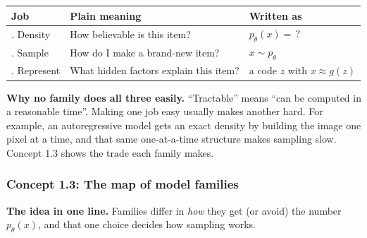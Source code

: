 \documentclass[12pt,a4paper]{article}
\begin{document}
\begin{center}
\begin{tabular}{@{}>{\raggedright\arraybackslash}p{}>{\raggedright\arraybackslash}p{}>{\raggedright\arraybackslash}p{}@{}}
\toprule
Job & Plain meaning & Written as \\
\midrule
1. Density & How believable is this item? & $p_\theta(x)=\,?$ \\
2. Sample & How do I make a brand-new item? & $x\sim p_\theta$ \\
3. Represent & What hidden factors explain this item? & a code $z$ with $x\approx g(z)$ \\
\bottomrule
\end{tabular}
\end{center}

\textbf{Why no family does all three easily.} ``Tractable'' means ``can be computed in a reasonable time''. Making one job easy usually makes another hard. For example, an autoregressive model gets an exact density by building the image one pixel at a time, and that same one-at-a-time structure makes sampling slow. Concept 1.3 shows the trade each family makes.

\subsubsection{Concept 1.3: The map of model families}\label{c1-3}

\textbf{The idea in one line.} Families differ in \emph{how} they get (or avoid) the number $p_\theta(x)$, and that one choice decides how sampling works.
\end{document}
